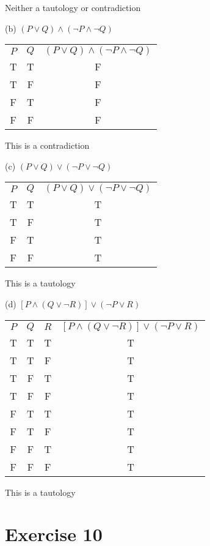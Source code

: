 \documentclass[11pt]{article}
\begin{document}
Neither a tautology or contradiction

\noindent (b) $(P \vee Q) \wedge (\neg P \wedge \neg Q)$\\ 

\begin{center}
\begin{tabular}{ c c c }
 $P$ & $Q$ & $(P \vee Q) \wedge (\neg P \wedge \neg Q)$\\ 
T & T & F\\  
T & F & F\\
F & T & F\\  
F & F & F
\end{tabular}
\end{center}

This is a contradiction

\noindent (c) $(P \vee Q) \vee (\neg P \vee \neg Q)$

\begin{center}
\begin{tabular}{ c c c }
 $P$ & $Q$ & $(P \vee Q) \vee (\neg P \vee \neg Q)$\\ 
T & T & T\\  
T & F & T\\
F & T & T\\  
F & F & T
\end{tabular}
\end{center}

This is a tautology

\noindent (d) $[P \wedge (Q \vee \neg R)] \vee (\neg P \vee R)$

\begin{center}
\begin{tabular}{ c c c c }
 $P$ & $Q$ & $R$ & $[P \wedge (Q \vee \neg R)] \vee (\neg P \vee R)$ \\ 
T & T & T & T\\  
T & T & F & T\\
T & F & T & T\\  
T & F & F & T\\
F & T & T & T\\  
F & T & F & T\\
F & F & T & T\\  
F & F & F & T\\
\end{tabular}
\end{center}

This is a tautology

\section*{Exercise 10}
\end{document}
